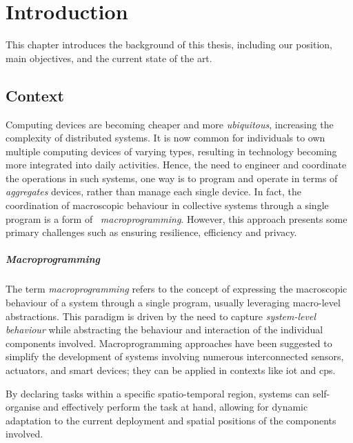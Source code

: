 
\chapter{Introduction}
\label{ch:introduction}
This chapter introduces the background of this thesis, including our position, main objectives,
and the current state of the art.

\section{Context}
\label{sec:context}

Computing devices are becoming cheaper and more \emph{ubiquitous}, increasing the complexity of distributed systems.
It is now common for individuals to own multiple computing devices of varying types,
resulting in technology becoming more integrated into daily activities.
Hence, the need to engineer and coordinate the operations in such systems, one way is to program and operate in terms of
    \emph{aggregates} devices, rather than manage each single device.
In fact, the coordination of macroscopic behaviour in collective systems through a single program is a form of
~\emph{macroprogramming}.
However, this approach presents some primary challenges such as ensuring resilience, efficiency and privacy.

\paragraph{Macroprogramming}
The term \emph{macroprogramming} refers to the concept of expressing the macroscopic behaviour of a system through a single
program, usually leveraging macro-level abstractions.
This paradigm is driven by the need to capture \emph{system-level behaviour} while abstracting the behaviour and interaction
of the individual components involved.
Macroprogramming approaches have been suggested to simplify the development of systems involving numerous interconnected
sensors, actuators, and smart devices; they can be applied in contexts like \ac{iot} and \ac{cps}.

By declaring tasks within a specific spatio-temporal region, systems can self-organise and effectively perform the task
at hand, allowing for dynamic adaptation to the current deployment and spatial positions of the components involved.

